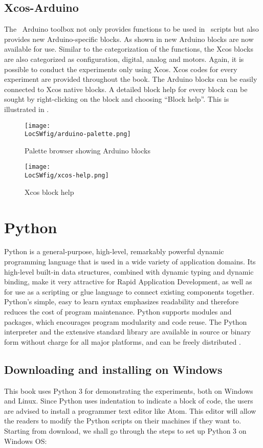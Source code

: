 \subsection{Xcos-Arduino}
The \scilab\ Arduino toolbox not only provides functions to be used in
\scilab\ scripts but also provides new Arduino-specific blocks. As
shown in  new Arduino blocks are now available
for use.  Similar to the categorization of the functions, the Xcos
blocks are also categorized as configuration, digital, analog and
motors. Again, it is possible to conduct the experiments only using
Xcos. Xcos codes for every experiment are provided throughout the
book. The Arduino blocks can be easily connected to Xcos native
blocks. A detailed block help for every block can be sought by right-clicking on the block and choosing ``Block help''. This is illustrated
in .

\begin{figure}
      \centering
      \texttt{[image: \\LocSWfig/arduino-palette.png]}
      \caption{Palette browser showing Arduino blocks}
      \label{arduino-palette}
\end{figure}

\begin{figure}
      \centering
      \texttt{[image: \\LocSWfig/xcos-help.png]}
      \caption{Xcos block help}
      \label{blk-help}
\end{figure}

\section{Python}
\label{sec:python-start}
Python is a general-purpose, high-level, remarkably powerful dynamic programming language 
that is used in a wide variety of application domains. Its high-level built-in data structures, 
combined with dynamic typing and dynamic binding, make it very attractive for Rapid Application Development, 
as well as for use as a scripting or glue language to connect existing components together. 
Python's simple, easy to learn syntax emphasizes readability and therefore reduces the cost of program maintenance. 
Python supports modules and packages, which encourages program modularity and code reuse. 
The Python interpreter and the extensive standard library are available in source or binary form without 
charge for all major platforms, and can be freely distributed \cite{python-ref}.


\subsection{Downloading and installing on Windows} \label{py-windows}
This book uses Python 3 for demonstrating the experiments, both on Windows 
and Linux. Since Python uses indentation to indicate a block of code, 
the users are advised to install a programmer text editor like Atom. 
This editor will allow the readers to modify the Python scripts on their 
machines if they want to. Starting from download, we shall go through the 
steps to set up Python 3 on Windows OS:

